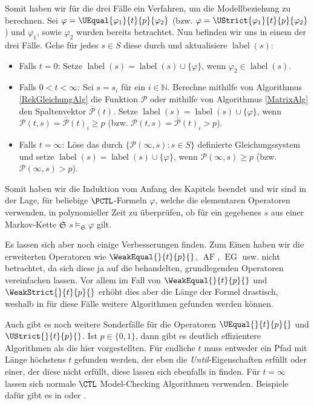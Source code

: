 Somit haben wir für die drei Fälle ein Verfahren, um die Modellbeziehung zu berechnen. Sei $\varphi = \UEqual{\varphi_1}{t}{p}{\varphi_2}$ (bzw. $\varphi = \UStrict{\varphi_1}{t}{p}{\varphi_2}$) und $\varphi_1$, sowie $\varphi_2$ wurden bereits betrachtet.
Nun befinden wir uns in einem der drei Fälle. Gehe für jedes $s\in S$ diese durch und aktualisiere $\operatorname{label}(s)$:
\begin{itemize}
	\item Falls $t=0$: Setze $\operatorname{label}(s) = \operatorname{label}(s)\cup \{\varphi\}$, wenn $\varphi_2\in \operatorname{label}(s)$.
	
	\item Falls $0<t<\infty$: Sei $s=s_i$ für ein $i\in \mathbb{N}$. Berechne mithilfe von Algorithmus \ref{RekGleichungAlg} die Funktion $\mathcal{P}$ oder mithilfe von Algorithmus \ref{MatrixAlg} den Spaltenvektor $\overline{\mathcal{P}}(t)$. 
	Setze $\operatorname{label}(s) = \operatorname{label}(s)\cup \{\varphi\}$, wenn $\mathcal{P}(t,s)=\overline{\mathcal{P}}(t)_i \geq p$ (bzw. $\mathcal{P}(t,s)=\overline{\mathcal{P}}(t)_i > p$).
	
	\item Falls $t=\infty$: Löse das durch $\{\mathcal{P}(\infty,s) : s\in S\}$ definierte Gleichungssystem und setze $\operatorname{label}(s) = \operatorname{label}(s)\cup \{\varphi\}$, wenn $\mathcal{P}(\infty,s) \geq p$ (bzw. $\mathcal{P}(\infty,s) > p$).
\end{itemize}
Somit haben wir die Induktion vom Anfang des Kapitels beendet und wir sind in der Lage, für beliebige $\PCTL$-Formeln $\varphi$, welche die elementaren Operatoren verwenden, in polynomieller Zeit zu überprüfen, ob für ein gegebenes $s$ aus einer Markov-Kette $\mathfrak{S}$ $s\models_\mathfrak{S} \varphi$ gilt.

Es lassen sich aber noch einige Verbesserungen finden. 
Zum Einen haben wir die erweiterten Operatoren wie $\WeakEqual{}{t}{p}{}$, $\operatorname{AF}$, $\operatorname{EG}$ usw. nicht betrachtet, da sich diese ja auf die behandelten, grundlegenden Operatoren vereinfachen lassen. 
Vor allem im Fall von $\WeakEqual{}{t}{p}{}$ und $\WeakStrict{}{t}{p}{}$ erhöht dies aber die Länge der Formel drastisch, weshalb in \cite{hansson1994logic} für diese Fälle weitere Algorithmen gefunden werden können.

Auch gibt es noch weitere Sonderfälle für die Operatoren $\UEqual{}{t}{p}{}$ und $\UStrict{}{t}{p}{}$. Ist $p\in \{0,1\}$, dann gibt es deutlich effizientere Algorithmen als die hier vorgestellten. Für endliche $t$ muss entweder ein Pfad mit Länge höchstens $t$ gefunden werden, der eben die \textit{Until}-Eigenschaften erfüllt oder einer, der diese nicht erfüllt, diese lassen sich ebenfalls in \cite{hansson1994logic} finden. Für $t=\infty$ lassen sich normale $\CTL$ Model-Checking Algorithmen verwenden. Beispiele dafür gibt es in \cite{baier2008principles} oder \cite{clarke1982design}.


